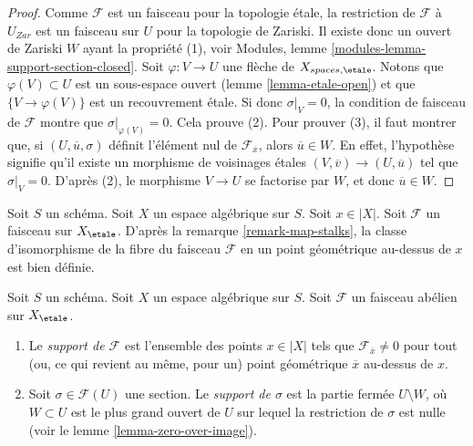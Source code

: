 \begin{proof}
Comme $\mathcal{F}$ est un faisceau pour la topologie \'etale, la restriction de
$\mathcal{F}$ à $U_{Zar}$ est un faisceau sur $U$ pour la topologie de Zariski.
Il existe donc un ouvert de Zariski $W$ ayant la propriété (1), voir
Modules, lemme \ref{modules-lemma-support-section-closed}. Soit
$\varphi : V \to U$ une flèche de $X_{spaces, \etale}$. Notons que
$\varphi(V) \subset U$ est un sous-espace ouvert
(lemme \ref{lemma-etale-open})
et que $\{V \to \varphi(V)\}$ est un recouvrement \'etale. Si donc
$\sigma|_V = 0$, la condition de faisceau de $\mathcal{F}$ montre que
$\sigma|_{\varphi(V)} = 0$. Cela prouve (2).
Pour prouver (3), il faut montrer que, si $(U, \overline{u}, \sigma)$
définit l'élément nul de $\mathcal{F}_{\overline{x}}$, alors
$\overline{u} \in W$. En effet, l'hypothèse signifie
qu'il existe un morphisme de voisinages \'etales
$(V, \overline{v}) \to (U, \overline{u})$ tel que
$\sigma|_V = 0$. D'après (2), le morphisme $V \to U$ se factorise par $W$,
et donc $\overline{u} \in W$.
\end{proof}

\noindent
Soit $S$ un schéma.
Soit $X$ un espace algébrique sur $S$.
Soit $x \in |X|$.
Soit $\mathcal{F}$ un faisceau sur $X_\etale$. D'après la
remarque \ref{remark-map-stalks},
la classe d'isomorphisme de la fibre du faisceau $\mathcal{F}$
en un point géométrique au-dessus de $x$ est bien définie.

\begin{definition}
\label{definition-support}
Soit $S$ un schéma.
Soit $X$ un espace algébrique sur $S$.
Soit $\mathcal{F}$ un faisceau abélien sur $X_\etale$.
\begin{enumerate}
\item Le {\it support de $\mathcal{F}$} est l'ensemble des
points $x \in |X|$ tels que $\mathcal{F}_{\overline{x}} \not = 0$
pour tout (ou, ce qui revient au même, pour un) point géométrique $\overline{x}$ au-dessus de $x$.
\item Soit $\sigma \in \mathcal{F}(U)$ une section.
Le {\it support de $\sigma$} est la partie fermée $U \setminus W$, où
$W \subset U$ est le plus grand ouvert de $U$ sur lequel la restriction de $\sigma$
est nulle (voir le
lemme \ref{lemma-zero-over-image}).
\end{enumerate}
\end{definition}


